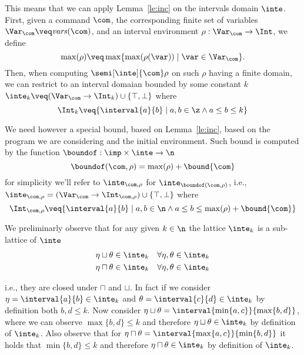 This means that we can apply Lemma~\ref{le:inc} on the intervals
domain \(\inte\).  First, given a command \(\com\), the corresponding
finite set of variables \(\Var_{\com} \veq \mathit{vars}(\com)\), and
an interval environment \(\rho : \Var_{\com} \to \Int\), we define
\[\max(\rho) \veq \max \{ \max(\rho(\var)) \mid \var \in \Var_{\com}
  \}.\]
%
Then, when computing \(\semi[\inte]{\com} \rho\) on such \(\rho\)
having a finite domain, we can restrict to an interval domaian bounded
by some constant \(k\)
\(\inte_k \veq (\Var_{\com} \to \Int_k) \cup \{\top, \bot\}\) where
\begin{equation*}
  \Int_k \veq \{ \interval{a}{b} \mid a, b \in \z \land
  a \leq b \leq k\}
\end{equation*}

We need however a special bound, based on Lemma~\ref{le:inc}, based on
the program we are considering and the initial environment. Such bound
is computed by the function \({\boundof : \imp \times \inte \to \n}\)
\begin{equation*}
  \boundof(\com, \rho) = \max(\rho) + \bound{\com}
\end{equation*}
for simplicity we'll refer to \(\inte_{\com,\rho}\) for
\(\inte_{\boundof(\com,\rho)}\), i.e.,
\({\inte_{\com,\rho} = (\Var_{\com} \to \Int_{\com,\rho}) \cup \{
  \top, \bot \}}\) where
\begin{equation*}
  \Int_{\com,\rho} \veq \{ \interval{a}{b} \mid a, b \in \n \land
  a \leq b \leq \max(\rho) + \bound{\com}\}
\end{equation*}

We preliminarly observe that for any given \(k\in\n\) the lattice
\(\inte_k\) is a sub-lattice of \(\inte\)
\begin{align*}
  \eta \sqcup \theta & \in \inte_k & \forall \eta,\theta \in \inte_k \\
  \eta \sqcap \theta & \in \inte_k & \forall \eta,\theta \in \inte_k
\end{align*}

i.e., they are closed under \(\sqcap\) and \(\sqcup\). In fact if we
consider \({\eta = \interval{a}{b} \in \inte_k}\) and
\({\theta = \interval{c}{d} \in \inte_k}\) by definition both
\(b,d \leq k\). Now consider
\({\eta \sqcup \theta = \interval{\min\{a,c\}}{\max\{b,d\}}}\), where
we can observe \(\max\{b,d\} \leq k\) and therefore
\({\eta \sqcup \theta \in \inte_k}\) by definition of
\(\inte_k\). Also observe that for
\({\eta \sqcap \theta = \interval{\max\{a,c\}}{\min\{b,d\}}}\) it
holds that \({\min\{b,d\} \leq k}\) and therefore
\({\eta \sqcap \theta \in \inte_k}\) by definition of \(\inte_k\).

